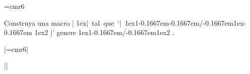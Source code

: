 

\font\sixrm=cmr6
\def\frac#1/#2{
{\sixrm\raise1ex\hbox{#1}}{\kern-0.1667em}/{\kern-0.1667em}{\sixrm\lower1ex\hbox{#2}}
}


\bigskip

\enunciadoS Construya una macro |\frac| tal que `|\frac1/2|' genere \frac1/2 .

\bigskip

\respuestaS

\noindent|\font\sixrm=cmr6|

\noindent|\def\frac#1/#2{|

\noindent|{\sixrm\raise1ex\hbox{#1}}{\kern-0.1667em}/{\kern-0.1667em}{\sixrm\lower1ex\hbox{#2}}|

\noindent|}|
\bye

